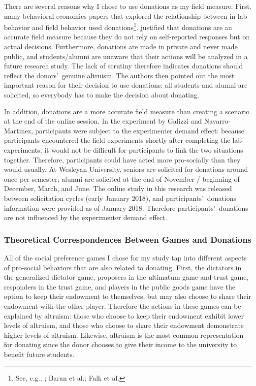 \documentclass[12pt]{article}
\begin{document}
There are several reasons why I chose to use donations as my field measure. First, many behavioral economics papers that explored the relationship between in-lab behavior and field behavior used donations\footnote{See, e.g., \cite{benz_meier_2006}; Baran et al.; Falk et al.}. \cite{falk_2013} justified that donations are an accurate field measure because they do not rely on self-reported responses but on actual decisions. Furthermore, donations are made in private and never made public, and students/alumni are unaware that their actions will be analyzed in a future research study. The lack of scrutiny therefore indicates donations should reflect the donors\rq \ genuine altruism. The authors then pointed out the most important reason for their decision to use donations: all students and alumni are solicited, so everybody has to make the decision about donating.

In addition, donations are a more accurate field measure than creating a scenario at the end of the online session. In the experiment by Galizzi and Navarro-Martinez, participants were subject to the experimenter demand effect: because participants encountered the field experiments shortly after completing the lab experiments, it would not be difficult for participants to link the two situations together. Therefore, participants could have acted more pro-socially than they would usually. At Wesleyan University, seniors are solicited for donations around once per semester; alumni are solicited at the end of November / beginning of December, March, and June. The online study in this research was released between solicitation cycles (early January 2018), and participants\rq \ donations information were provided as of January 2018. Therefore participants\rq \ donations are not influenced by the experimenter demand effect.


\subsubsection{Theoretical Correspondences Between Games and Donations}

All of the social preference games I chose for my study tap into different aspects of pro-social behaviors that are also related to donating. First, the dictators in the generalized dictator game, proposers in the ultimatum game and trust game, responders in the trust game, and players in the public goods game have the option to keep their endowment to themselves, but may also choose to share their endowment with the other player. Therefore the actions in these games can be explained by altruism: those who choose to keep their endowment exhibit lower levels of altruism, and those who choose to share their endowment demonstrate higher levels of altruism. Likewise, altruism is the most common representation for donating since the donor chooses to give their income to the university to benefit future students. 
\end{document}
